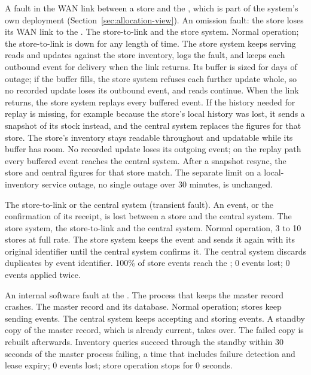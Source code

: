 \begingroup
\footnotesize
\newcommand{\scenario}[1]{\label{scn:#1}\qascenario{#1}}
\scenario{AV-1}
  {A fault in the WAN link between a store and the \DC, which is part of the system's own deployment (Section~\ref{sec:allocation-view}).}
  {An omission fault: the store loses its WAN link to the \DC.}
  {The store-to-\DC link and the store system.}
  {Normal operation; the store-to-\DC link is down for any length of time.}
  {The store system keeps serving reads and updates against the store inventory, logs the fault, and keeps each outbound event for delivery when the link returns. Its buffer is sized for days of outage; if the buffer fills, the store system refuses each further update whole, so no recorded update loses its outbound event, and reads continue. When the link returns, the store system replays every buffered event. If the history needed for replay is missing, for example because the store's local history was lost, it sends a snapshot of its stock instead, and the central system replaces the figures for that store.}
  {The store's inventory stays readable throughout and updatable while its buffer has room. No recorded update loses its outgoing event; on the replay path every buffered event reaches the central system. After a snapshot resync, the store and central figures for that store match. The separate limit on a local-inventory service outage, no single outage over 30 minutes, is unchanged.}

\scenario{AV-2}
  {The store-to-\DC link or the central system (transient fault).}
  {An event, or the confirmation of its receipt, is lost between a store and the central system.}
  {The store system, the store-to-\DC link and the central system.}
  {Normal operation, 3 to 10 stores at full rate.}
  {The store system keeps the event and sends it again with its original identifier until the central system confirms it. The central system discards duplicates by event identifier.}
  {100\% of store events reach the \DC; 0 events lost; 0 events applied twice.}

\scenario{AV-3}
  {An internal software fault at the \DC.}
  {The process that keeps the master record crashes.}
  {The master record and its database.}
  {Normal operation; stores keep sending events.}
  {The central system keeps accepting and storing events. A standby copy of the master record, which is already current, takes over. The failed copy is rebuilt afterwards.}
  {Inventory queries succeed through the standby within 30 seconds of the master process failing, a time that includes failure detection and lease expiry; 0 events lost; store operation stops for 0 seconds.}

